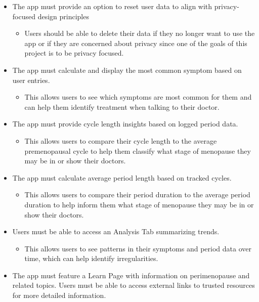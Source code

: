 \begin{itemize}
\begin{itemize}
        \end{itemize}
      \item The app must provide an option to reset user data to align with privacy-focused design principles
        \begin{itemize}
          \item Users should be able to delete their data if they no longer want to use the app or if they are concerned about privacy since one of the goals of this project is to be privacy focused.
        \end{itemize}
      \item The app must calculate and display the most common symptom based on user entries.
        \begin{itemize}
          \item This allows users to see which symptoms are most common for them and can help them identify treatment when talking to their doctor\cite{Brambilla1994}.
        \end{itemize}
      \item The app must provide cycle length insights based on logged period data.
        \begin{itemize}
          \item This allows users to compare their cycle length to the average premenopausal cycle to help them classify what stage of menopause they may be in or show their doctors\cite{Brambilla1994}.
        \end{itemize}
      \item The app must calculate average period length based on tracked cycles.
        \begin{itemize}
          \item This allows users to compare their period duration to the average period duration to help inform them what stage of menopause they may be in or show their doctors\cite{Brambilla1994}.
        \end{itemize}
      \item Users must be able to access an Analysis Tab summarizing trends.
        \begin{itemize}
          \item This allows users to see patterns in their symptoms and period data over time, which can help identify irregularities\cite{Brambilla1994}.
        \end{itemize}
      \item The app must feature a Learn Page with information on perimenopause and related topics. Users must be able to access external links to trusted resources for more detailed information.

\end{itemize}
